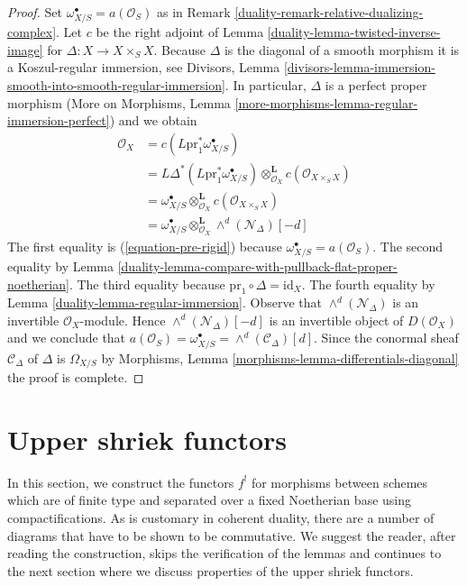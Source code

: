 \begin{proof}

Set $\omega_{X/S}^\bullet = a(\mathcal{O}_S)$ as in
Remark \ref{duality-remark-relative-dualizing-complex}.
Let $c$ be the right adjoint of Lemma \ref{duality-lemma-twisted-inverse-image} for
$\Delta : X \to X \times_S X$. Because $\Delta$
is the diagonal of a smooth morphism it is a
Koszul-regular immersion, see Divisors, Lemma
\ref{divisors-lemma-immersion-smooth-into-smooth-regular-immersion}.
In particular, $\Delta$ is a perfect proper morphism
(More on Morphisms, Lemma \ref{more-morphisms-lemma-regular-immersion-perfect})
and we obtain
\begin{align*}
\mathcal{O}_X
& =
c(L\text{pr}_1^*\omega_{X/S}^\bullet) \\
& =
L\Delta^*(L\text{pr}_1^*\omega_{X/S}^\bullet)
\otimes_{\mathcal{O}_X}^\mathbf{L}
c(\mathcal{O}_{X \times_S X}) \\
& =
\omega_{X/S}^\bullet \otimes_{\mathcal{O}_X}^\mathbf{L}
c(\mathcal{O}_{X \times_S X}) \\
& =
\omega_{X/S}^\bullet
\otimes_{\mathcal{O}_X}^\mathbf{L}
\wedge^d(\mathcal{N}_\Delta)[-d]
\end{align*}
The first equality is (\ref{equation-pre-rigid}) because
$\omega_{X/S}^\bullet = a(\mathcal{O}_S)$. The second equality by
Lemma \ref{duality-lemma-compare-with-pullback-flat-proper-noetherian}.
The third equality because $\text{pr}_1 \circ \Delta = \text{id}_X$.
The fourth equality by Lemma \ref{duality-lemma-regular-immersion}.
Observe that $\wedge^d(\mathcal{N}_\Delta)$ is an invertible
$\mathcal{O}_X$-module. Hence $\wedge^d(\mathcal{N}_\Delta)[-d]$
is an invertible object of $D(\mathcal{O}_X)$ and we conclude that
$a(\mathcal{O}_S) = \omega_{X/S}^\bullet = \wedge^d(\mathcal{C}_\Delta)[d]$.
Since the conormal sheaf $\mathcal{C}_\Delta$ of $\Delta$ is
$\Omega_{X/S}$ by
Morphisms, Lemma \ref{morphisms-lemma-differentials-diagonal}
the proof is complete.
\end{proof}

\section{Upper shriek functors}
\label{duality-section-upper-shriek}
In this section, we construct the functors $f^!$ for morphisms
between schemes which are of finite type and separated
over a fixed Noetherian base using compactifications.
As is customary in coherent duality, there are a number of diagrams
that have to be shown to be commutative. We suggest the reader,
after reading the construction, skips the verification of the
lemmas and continues to the next section where we discuss
properties of the upper shriek functors.


